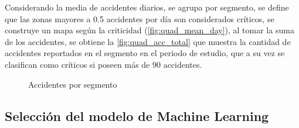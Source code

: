\documentclass[12pt]{article}
\begin{document}
Considerando la media de accidentes diarios, se agrupa por segmento, se define que las zonas mayores a 0.5 accidentes por día son considerados críticos, se construye un mapa según la criticidad (\cref{fig:quad_mean_day}), al tomar la suma de los accidentes, se obtiene la \cref{fig:quad_acc_total} que muestra la cantidad de accidentes reportados en el segmento en el periodo de estudio, que a su vez se clasifican como críticos si poseen más de 90 accidentes.

\begin{figure}[H]
    \centering
    \caption{Accidentes por segmento}
\end{figure}

\subsection{Selección del modelo de Machine Learning}
\end{document}
